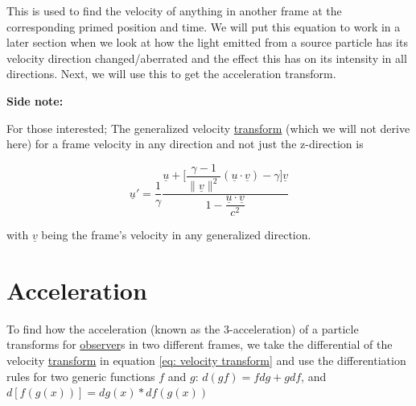 This is used to find the velocity of anything in another frame at the corresponding primed position and time.
We will put this equation to work in a later section when we look at how the light emitted from a source particle has its velocity direction changed/aberrated and the effect this has on its intensity in all directions. Next, we will use this to get the acceleration transform.

\textbf{Side note:}

For those interested; The generalized velocity \hyperlink{def-transform}{transform} (which we will not derive here) for a frame velocity in any direction and not just the z-direction is

\begin{equation}
	\underline{u}{'} = \dfrac{1}{{\gamma}} \dfrac{\underline{u} + \Big[\dfrac{{\gamma}-1}{\|\underline{v}\|^2}(\underline{u}\cdot \underline{v})-{\gamma} \Big] \underline{v}}{1-\dfrac{\underline{u}\cdot\underline{v}}{{c}^2}}
\end{equation}

with ${\underline{v}}$ being the frame's velocity in any generalized direction.

\section{Acceleration} \label{sect: Acceleration}

To find how the acceleration (known as the 3-acceleration) of a particle transforms for \hyperlink{def-observer}{observer}s in two different frames, we take the differential of the velocity \hyperlink{def-transform}{transform} in equation \eqref{eq: velocity transform} and use the differentiation rules for two generic functions ${f}$ and ${g}$: ${d(gf)} = {f} {dg} + {g} {df}$, and ${d[{{f}({g}(x))}]} = {{dg}(x)} * {df({{g}(x)})}$

